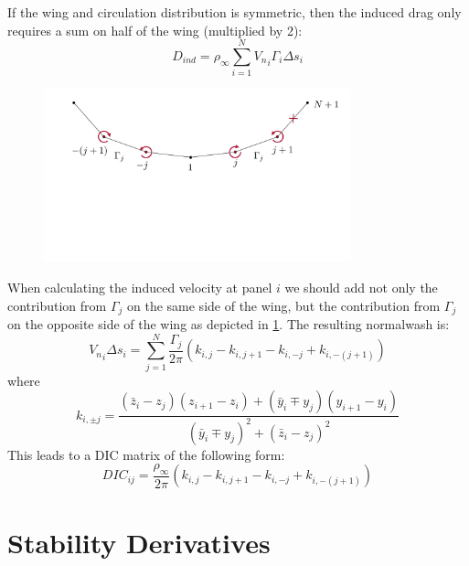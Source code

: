 \documentclass{article}
\begin{document}
If the wing and circulation distribution is symmetric, then the induced drag only requires a sum on half of the wing (multiplied by 2):
\begin{equation}
D_{ind} = \rho_\infty \sum_{i=1}^N {V_n}_i \Gamma_i  \Delta s_i
\end{equation}


\begin{figure}[htbp]
\centering
\includegraphics[width=3.5in]{figs/induced2}
\caption{}
\label{fig:induced2}
\end{figure}

When calculating the induced velocity at panel $i$ we should add not only the contribution from $\Gamma_j$ on the same side of the wing, but the contribution from $\Gamma_j$ on the opposite side of the wing as depicted in \cref{fig:induced2}.  The resulting normalwash is:
\begin{equation}
{V_n}_i \Delta s_i = \sum_{j=1}^N 
\frac{\Gamma_j}{2\pi} \left( 
k_{i,j} - k_{i, j+1} - k_{i, -j} + k_{i, -(j+1)}
\right)
\end{equation}
where
\begin{equation}
k_{i,\pm j} = \frac{(\bar z_i - z_j) (z_{i+1} - z_i) + (\bar y_i \mp y_j) (y_{i+1} - y_i)}{(\bar y_i \mp y_j)^2 + (\bar z_i - z_j)^2} 
\end{equation}
This leads to a DIC matrix of the following form:
\begin{equation}
DIC_{ij} = \frac{\rho_\infty}{2\pi} \left(k_{i,j} - k_{i, j+1} - k_{i, -j} + k_{i, -(j+1)}
\right)
\end{equation}





\section{Stability Derivatives}
\end{document}
